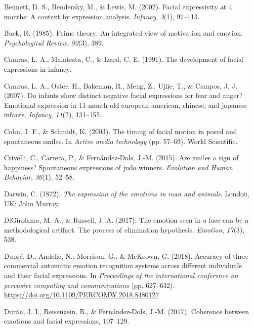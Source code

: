 \documentclass[man]{apa6}
\begin{document}
\leavevmode\hypertarget{ref-bennett2002facial}{}%
Bennett, D. S., Bendersky, M., \& Lewis, M. (2002). Facial expressivity at 4 months: A context by expression analysis. \emph{Infancy}, \emph{3}(1), 97--113.

\leavevmode\hypertarget{ref-buck1985prime}{}%
Buck, R. (1985). Prime theory: An integrated view of motivation and emotion. \emph{Psychological Review}, \emph{92}(3), 389.

\leavevmode\hypertarget{ref-camras1991development}{}%
Camras, L. A., Malatesta, C., \& Izard, C. E. (1991). The development of facial expressions in infancy.

\leavevmode\hypertarget{ref-camras2007infants}{}%
Camras, L. A., Oster, H., Bakeman, R., Meng, Z., Ujiie, T., \& Campos, J. J. (2007). Do infants show distinct negative facial expressions for fear and anger? Emotional expression in 11-month-old european american, chinese, and japanese infants. \emph{Infancy}, \emph{11}(2), 131--155.

\leavevmode\hypertarget{ref-cohn2003timing}{}%
Cohn, J. F., \& Schmidt, K. (2003). The timing of facial motion in posed and spontaneous smiles. In \emph{Active media technology} (pp. 57--69). World Scientific.

\leavevmode\hypertarget{ref-crivelli2015smiles}{}%
Crivelli, C., Carrera, P., \& Fernández-Dols, J.-M. (2015). Are smiles a sign of happiness? Spontaneous expressions of judo winners. \emph{Evolution and Human Behavior}, \emph{36}(1), 52--58.

\leavevmode\hypertarget{ref-darwin1872expression}{}%
Darwin, C. (1872). \emph{The expression of the emotions in man and animals}. London, UK: John Murray.

\leavevmode\hypertarget{ref-digirolamo2017emotion}{}%
DiGirolamo, M. A., \& Russell, J. A. (2017). The emotion seen in a face can be a methodological artifact: The process of elimination hypothesis. \emph{Emotion}, \emph{17}(3), 538.

\leavevmode\hypertarget{ref-dupre2018accuracy}{}%
Dupré, D., Andelic, N., Morrison, G., \& McKeown, G. (2018). Accuracy of three commercial automatic emotion recognition systems across different individuals and their facial expressions. In \emph{Proceedings of the international conference on pervasive computing and communications} (pp. 627--632). \url{https://doi.org/10.1109/PERCOMW.2018.8480127}

\leavevmode\hypertarget{ref-duran2017coherence}{}%
Durán, J. I., Reisenzein, R., \& Fernández-Dols, J.-M. (2017). Coherence between emotions and facial expressions, 107--129.
\end{document}
